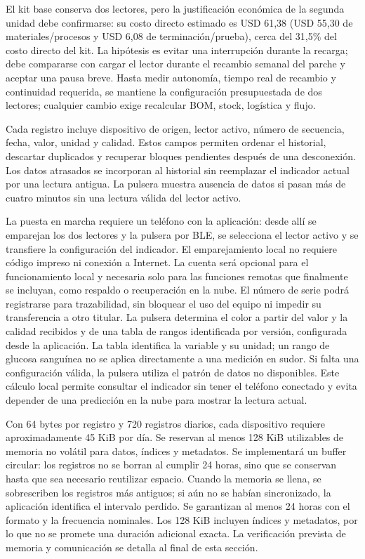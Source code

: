 El kit base conserva dos lectores, pero la justificación económica de la segunda unidad debe confirmarse: su costo directo estimado es USD 61,38 (USD 55,30 de materiales/procesos y USD 6,08 de terminación/prueba), cerca del 31,5\% del costo directo del kit. La hipótesis es evitar una interrupción durante la recarga; debe compararse con cargar el lector durante el recambio semanal del parche y aceptar una pausa breve. Hasta medir autonomía, tiempo real de recambio y continuidad requerida, se mantiene la configuración presupuestada de dos lectores; cualquier cambio exige recalcular BOM, stock, logística y flujo.

Cada registro incluye dispositivo de origen, lector activo, número de secuencia, fecha, valor, unidad y calidad. Estos campos permiten ordenar el historial, descartar duplicados y recuperar bloques pendientes después de una desconexión. Los datos atrasados se incorporan al historial sin reemplazar el indicador actual por una lectura antigua. La pulsera muestra ausencia de datos si pasan más de cuatro minutos sin una lectura válida del lector activo.

La puesta en marcha requiere un teléfono con la aplicación: desde allí se emparejan los dos lectores y la pulsera por BLE, se selecciona el lector activo y se transfiere la configuración del indicador. El emparejamiento local no requiere código impreso ni conexión a Internet. La cuenta será opcional para el funcionamiento local y necesaria solo para las funciones remotas que finalmente se incluyan, como respaldo o recuperación en la nube. El número de serie podrá registrarse para trazabilidad, sin bloquear el uso del equipo ni impedir su transferencia a otro titular. La pulsera determina el color a partir del valor y la calidad recibidos y de una tabla de rangos identificada por versión, configurada desde la aplicación. La tabla identifica la variable y su unidad; un rango de glucosa sanguínea no se aplica directamente a una medición en sudor. Si falta una configuración válida, la pulsera utiliza el patrón de datos no disponibles. Este cálculo local permite consultar el indicador sin tener el teléfono conectado y evita depender de una predicción en la nube para mostrar la lectura actual.

Con 64 bytes por registro y 720 registros diarios, cada dispositivo requiere aproximadamente 45 KiB por día. Se reservan al menos 128 KiB utilizables de memoria no volátil para datos, índices y metadatos. Se implementará un buffer circular: los registros no se borran al cumplir 24 horas, sino que se conservan hasta que sea necesario reutilizar espacio. Cuando la memoria se llena, se sobrescriben los registros más antiguos; si aún no se habían sincronizado, la aplicación identifica el intervalo perdido. Se garantizan al menos 24 horas con el formato y la frecuencia nominales. Los 128 KiB incluyen índices y metadatos, por lo que no se promete una duración adicional exacta. La verificación prevista de memoria y comunicación se detalla al final de esta sección.

